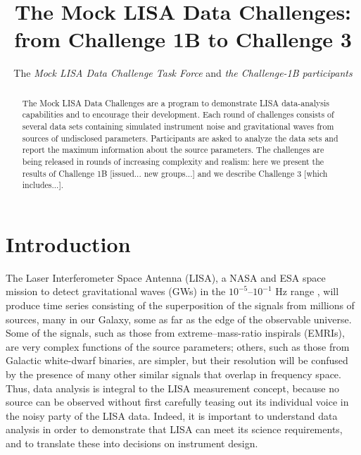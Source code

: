 \documentclass{iopart}
\begin{document}
\title{The Mock LISA Data Challenges: from Challenge 1B to Challenge 3}

\author{The \emph{Mock LISA Data Challenge Task Force} and \emph{the Challenge-1B participants}}

\address{Jet Propulsion Laboratory, California Inst.\ of Technology, Pasadena, CA 91109, USA}


\begin{abstract}
The Mock LISA Data Challenges are a program to demonstrate LISA data-analysis capabilities and to encourage their development. Each round of challenges consists of several data sets containing simulated instrument noise and gravitational waves from sources of undisclosed parameters. Participants are asked to analyze the data sets and report the maximum information about the source parameters. The challenges are being released in rounds of increasing complexity and realism: here we present the results of Challenge 1B [issued... new groups...] and we describe Challenge 3 [which includes...].
\end{abstract}

\vspace{-18pt}


\section{Introduction}

The Laser Interferometer Space Antenna (LISA), a NASA and ESA space mission to detect gravitational waves (GWs) in the $10^{-5}$--$10^{-1}$ Hz range \cite{lisa}, will produce time series consisting of the superposition of the signals from millions of sources, many in our Galaxy, some as far as the edge of the observable universe. Some of the signals, such as those from extreme--mass-ratio inspirals (EMRIs), are very complex functions of the source parameters; others, such as those from Galactic white-dwarf binaries, are simpler, but their resolution will be confused by the presence of many other similar signals that overlap in frequency space. Thus, data analysis is integral to the LISA measurement concept, because no source can be observed without first carefully teasing out its individual voice in the noisy party of the LISA data. Indeed, it is important to understand data analysis in order to demonstrate that LISA can meet its science requirements, and to translate these into decisions on instrument design.
\end{document}
